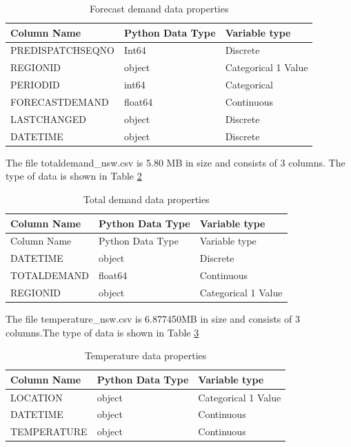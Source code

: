 \documentclass[mstat,12pt]{unswthesis}
\begin{document}
\begin{table}[H]
\centering
\begin{tabular}{lll} 
\hline\hline
\textbf{Column Name} & \textbf{Python Data Type} & \textbf{Variable type}  \\ 
\hline\hline
PREDISPATCHSEQNO     & Int64                     & Discrete                \\
REGIONID             & object                    & Categorical 1 Value     \\
PERIODID             & int64                     & Categorical             \\
FORECASTDEMAND       & float64                   & Continuous              \\
LASTCHANGED          & object                    & Discrete                \\
DATETIME             & object                    & Discrete                \\
\hline\hline
\end{tabular}
\caption{Forecast demand data properties}
\label{tab:forecast_demand}
\end{table}

The file totaldemand\_nsw.csv is 5.80 MB in size and consists of 3
columns. The type of data is shown in Table \ref{tab:total_demand}

\begin{table}[H]
\centering
\begin{tabular}{lll} 
\hline\hline
\textbf{Column Name} & \textbf{Python Data Type} & \textbf{Variable type}  \\ 
\hline\hline
Column Name & Python Data Type & Variable type        \\
DATETIME    & object           & Discrete             \\
TOTALDEMAND & float64          & Continuous           \\
REGIONID    & object           & Categorical 1 Value \\
\hline\hline
\end{tabular}
\caption{Total demand data properties}
\label{tab:total_demand}
\end{table}

The file temperature\_nsw.csv is 6.877450MB in size and consists of 3
columns.The type of data is shown in Table \ref{tab:temperature}

\begin{table}[H]
\centering
\begin{tabular}{lll} 
\hline\hline
\textbf{Column Name} & \textbf{Python Data Type} & \textbf{Variable type}  \\ 
\hline\hline
LOCATION             & object                    & Categorical 1 Value     \\
DATETIME             & object                    & Continuous              \\
TEMPERATURE          & object                    & Continuous             \\
\hline\hline
\end{tabular}
\caption{Temperature data properties}
\label{tab:temperature}
\end{table}
\end{document}
